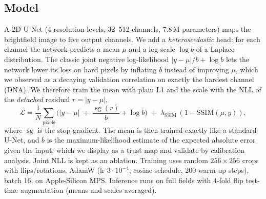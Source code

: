 \documentclass[11pt,a4paper]{article}
\begin{document}
\subsection{Model}
A 2D U-Net (4 resolution levels, 32--512 channels, 7.8\,M parameters) maps the brightfield image to five output channels. We add a \emph{heteroscedastic} head: for each channel the network predicts a mean $\mu$ and a log-scale $\log b$ of a Laplace distribution. The classic joint negative log-likelihood $|y-\mu|/b+\log b$ \cite{kendall2017} lets the network lower its loss on hard pixels by inflating $b$ instead of improving $\mu$, which we observed as a decaying validation correlation on exactly the hardest channel (DNA). We therefore train the mean with plain L1 and the scale with the NLL of the \emph{detached} residual $r=|y-\mu|$,
\begin{equation}
\mathcal{L} = \frac{1}{N}\sum_{\text{pixels}} \Big( |y-\mu| \;+\; \frac{\operatorname{sg}(r)}{b} + \log b \Big) \;+\; \lambda_{\text{SSIM}}\,(1-\text{SSIM}(\mu,y)),
\end{equation}
where $\operatorname{sg}$ is the stop-gradient. The mean is then trained exactly like a standard U-Net, and $b$ is the maximum-likelihood estimate of the expected absolute error given the input, which we display as a trust map and validate by calibration analysis. Joint NLL is kept as an ablation. Training uses random $256\times256$ crops with flips/rotations, AdamW (lr $3\cdot10^{-4}$, cosine schedule, 200 warm-up steps), batch 16, on Apple-Silicon MPS. Inference runs on full fields with 4-fold flip test-time augmentation (means and scales averaged).
\end{document}
